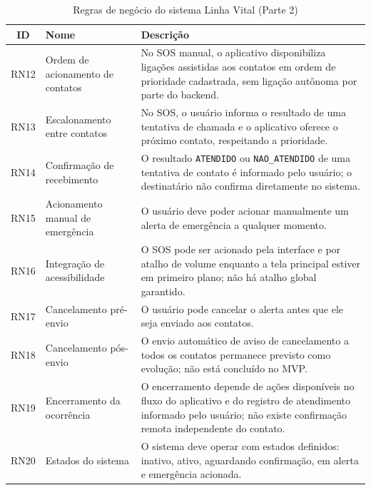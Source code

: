 \begin{table}[H]
\caption{Regras de negócio do sistema Linha Vital (Parte 2)}
\label{quad_rn2}
\centering

\begin{tabular}{|c|p{4cm}|p{8cm}|}
\hline
\textbf{ID} & \textbf{Nome} & \textbf{Descrição} \\
\hline

RN12 & Ordem de acionamento de contatos &
No SOS manual, o aplicativo disponibiliza ligações assistidas aos contatos em ordem de prioridade cadastrada, sem ligação autônoma por parte do backend. \\
\hline


RN13 & Escalonamento entre contatos &
No SOS, o usuário informa o resultado de uma tentativa de chamada e o aplicativo oferece o próximo contato, respeitando a prioridade. \\
\hline

RN14 & Confirmação de recebimento &
O resultado \texttt{ATENDIDO} ou \texttt{NAO\_ATENDIDO} de uma tentativa de contato é informado pelo usuário; o destinatário não confirma diretamente no sistema. \\
\hline

RN15 & Acionamento manual de emergência &
O usuário deve poder acionar manualmente um alerta de emergência a qualquer momento. \\
\hline

RN16 & Integração de acessibilidade &
O SOS pode ser acionado pela interface e por atalho de volume enquanto a tela principal estiver em primeiro plano; não há atalho global garantido. \\
\hline

RN17 & Cancelamento pré-envio &
O usuário pode cancelar o alerta antes que ele seja enviado aos contatos. \\
\hline

RN18 & Cancelamento pós-envio &
O envio automático de aviso de cancelamento a todos os contatos permanece previsto como evolução; não está concluído no MVP. \\
\hline

RN19 & Encerramento da ocorrência &
O encerramento depende de ações disponíveis no fluxo do aplicativo e do registro de atendimento informado pelo usuário; não existe confirmação remota independente do contato. \\
\hline

RN20 & Estados do sistema &
O sistema deve operar com estados definidos: inativo, ativo, aguardando confirmação, em alerta e emergência acionada. \\
\hline


\end{tabular}
\end{table}
